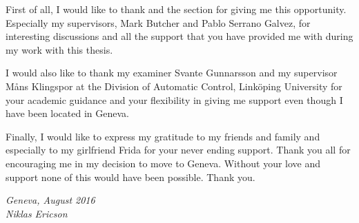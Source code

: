 \begin{acknowledgments}
First of all, I would like to thank \abbrCERN and the \abbrENSTIECE section for giving me this opportunity. Especially my supervisors, Mark Butcher and Pablo Serrano Galvez, for interesting discussions and all the support that you have provided me with during my work with this thesis.

I would also like to thank my examiner Svante Gunnarsson and my supervisor Måns Klingspor at the Division of Automatic Control, Linköping University for your academic guidance and your flexibility in giving me support even though I have been located in Geneva.

Finally, I would like to express my gratitude to my friends and family and especially to my girlfriend Frida for your never ending support. Thank you all for encouraging me in my decision to move to Geneva. Without your love and support none of this would have been possible. Thank you.

  \addvspace{1em}
  \begin{flushright}
    \textit{%
      Geneva, August 2016\\
      Niklas Ericson%
    }
  \end{flushright}
\end{acknowledgments}
